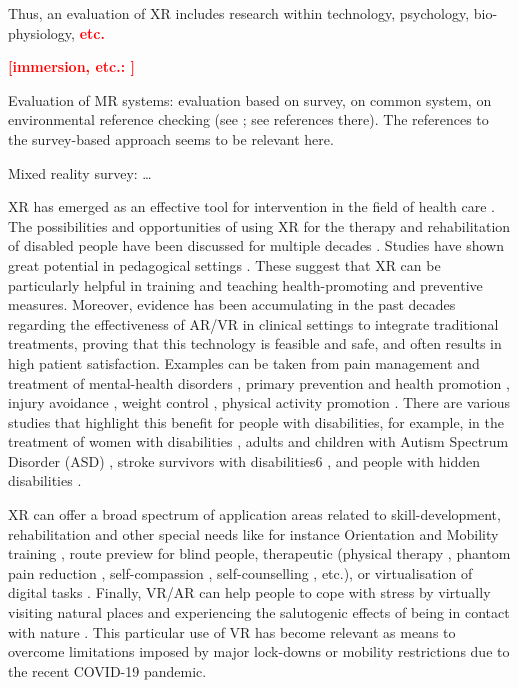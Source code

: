 \documentclass[11pt,english]{nik}
\newcommand{\WVL}[1]{\textbf{\textcolor{red}{#1}}}
\begin{document}
Thus, an evaluation of XR includes research within technology, psychology, bio-physiology, \WVL{etc.}

\WVL{[immersion, etc.:  \autocite{Tjostheim1430618} ]}

Evaluation of MR systems: evaluation based on survey, on common system, on environmental reference checking (see \citet[p.13][]{rokhsaritalemiReviewMixedReality2020}; see  references there). The references to the survey-based approach seems to be relevant here. 

Mixed reality survey: \autocite{Costanza2009} \dots



XR has emerged as an effective tool for intervention in the field of health care \autocite{mesa-gresa-effectiveness-2018}. 
The possibilities and opportunities of using XR for the therapy and rehabilitation
of disabled people have been discussed for multiple decades \autocite{kuhlen1995virtual,wilson1997virtual}.
Studies have shown great potential in
pedagogical settings \autocite{akcayir2017advantages,bacca2014augmented,koutromanos2015the}. These suggest that XR can be
particularly helpful in training and teaching health-promoting and preventive measures. Moreover, evidence has been
accumulating in the past decades regarding the effectiveness of AR/VR in clinical settings to integrate traditional
treatments, proving that this technology is feasible and safe, and often results in high patient satisfaction. Examples
can be taken from pain management and treatment of mental-health disorders \autocite{white2018a,dascal2017virtual}, 
primary prevention and health promotion \autocite{jerdan2018head,litleskare2020enable},
injury avoidance \autocite{omaki2017systematic}, weight control \autocite{fox2009virtual}, 
physical activity promotion \autocite{calogiuri-litleskare-macintyre-virtualexperiences-2019}.
There are various studies that highlight this benefit for people with disabilities, for example, in the treatment of women
with disabilities \autocite{nosek2016an}, adults
and children with Autism Spectrum Disorder (ASD) \autocite{newbutt2017the,cai2013design}, 
stroke survivors with disabilities6 \autocite{badia2016virtual}, 
and people with hidden disabilities \autocite{poyade2017using,poyade2019isensevr}. 

XR can offer a broad spectrum of application
areas \autocite{mott2019accessible} related to
skill-development, rehabilitation and other special needs like for instance Orientation and Mobility
training \autocite{zhao2018enabling}, route preview for blind people, therapeutic (physical
therapy \autocite{gonzalezfranco2014empowering}, phantom pain reduction \autocite{you2005virtual}, 
self-compassion \autocite{falconer2014embodying},
self-counselling \autocite{osimo2015conversations}, etc.), 
or virtualisation of digital tasks \autocite{mott2019accessible}. 
Finally, VR/AR can help
people to cope with stress by virtually visiting natural places and experiencing the salutogenic effects of being in
contact with nature \autocite{white2018a,litleskare2020enable}.
This particular use of VR has become relevant as means to overcome limitations imposed by major lock-downs or
mobility restrictions due to the recent COVID-19 pandemic. 
\end{document}
